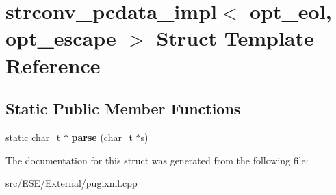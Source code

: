 \hypertarget{structstrconv__pcdata__impl}{\section{strconv\-\_\-pcdata\-\_\-impl$<$ opt\-\_\-eol, opt\-\_\-escape $>$ Struct Template Reference}
\label{structstrconv__pcdata__impl}
}
\subsection*{Static Public Member Functions}
\begin{DoxyCompactItemize}
\item 
\hypertarget{structstrconv__pcdata__impl_a0aa794c648c72338d92b86c95c681b32}{static char\-\_\-t $\ast$ {\bfseries parse} (char\-\_\-t $\ast$s)}\label{structstrconv__pcdata__impl_a0aa794c648c72338d92b86c95c681b32}

\end{DoxyCompactItemize}


The documentation for this struct was generated from the following file\-:\begin{DoxyCompactItemize}
\item 
src/\-E\-S\-E/\-External/pugixml.\-cpp\end{DoxyCompactItemize}
